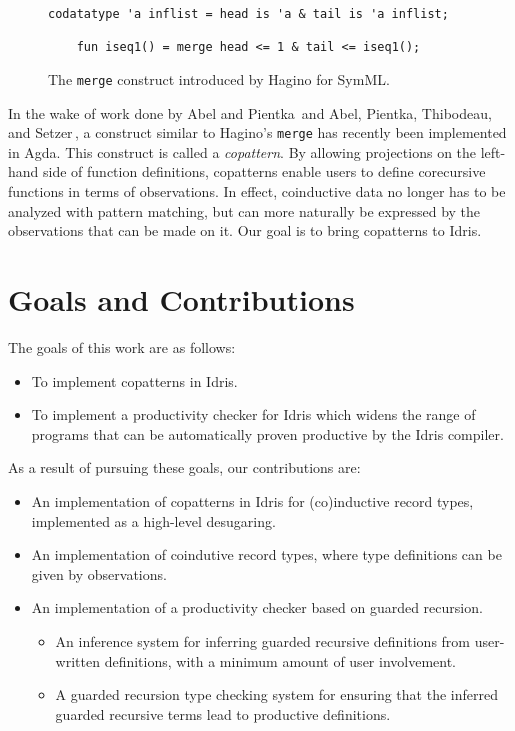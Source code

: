 
\begin{figure}[H]
  \centering
  \begin{lstlisting}[mathescape]
    codatatype 'a inflist = head is 'a & tail is 'a inflist;

    fun iseq1() = merge head <= 1 & tail <= iseq1();
  \end{lstlisting}
  \caption{The \texttt{merge} construct introduced by Hagino for SymML.}
  \label{fig:merge_hagino}
\end{figure}

In the wake of work done by Abel and Pientka\,\citep{Abel13Wellfounded} and
Abel, Pientka, Thibodeau, and Setzer\,\citep{Abel13Copatterns}, a construct
similar to Hagino's \texttt{merge} has recently been implemented in Agda. This
construct is called a \emph{copattern}. By allowing projections on the left-hand
side of function definitions, copatterns enable users to define corecursive
functions in terms of observations. In effect, coinductive data no longer has to
be analyzed with pattern matching, but can more naturally be expressed by the
observations that can be made on it. Our goal is to bring copatterns to Idris.


\section{Goals and Contributions}
The goals of this work are as follows:

\begin{itemize}
\item To implement copatterns in Idris.
\item To implement a productivity checker for Idris which widens the range of
  programs that can be automatically proven productive by the Idris compiler.
\end{itemize}

As a result of pursuing these goals, our contributions are:

\begin{itemize}
\item An implementation of copatterns in Idris for (co)inductive record types,
  implemented as a high-level desugaring.
\item An implementation of coindutive record types, where type definitions can be
  given by observations.
\item An implementation of a productivity checker based on guarded recursion. 
  \begin{itemize}
    \item An inference system for inferring guarded recursive definitions
      from user-written definitions, with a minimum amount of user involvement.
    \item A guarded recursion type checking system for ensuring that the
      inferred guarded recursive terms lead to productive definitions.
  \end{itemize}
\end{itemize}
